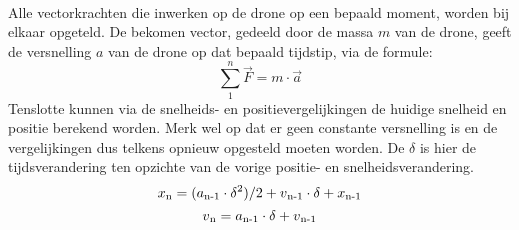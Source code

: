 \\
Alle vectorkrachten die inwerken op de drone op een bepaald moment, worden bij elkaar opgeteld. De bekomen vector, gedeeld door de massa \(m\) van de drone, geeft de versnelling \(a\) van de drone op dat bepaald tijdstip, via de formule:
\\
\begin{equation*}
\sum_{1}^{n} \vec{F} = m \cdot \vec{a} \label{krachtenevenwicht}
\end{equation*}
Tenslotte kunnen via de snelheids- en positievergelijkingen de huidige snelheid en positie berekend worden. Merk wel op dat er geen constante versnelling is en de vergelijkingen dus telkens opnieuw opgesteld moeten worden. De \(\delta\) is hier de tijdsverandering ten opzichte van de vorige positie- en snelheidsverandering.
\\
\begin{equation*}
x\textsubscript{n} = (a\textsubscript{n-1} \cdot \delta\textsuperscript{2})/2 + v\textsubscript{n-1} \cdot \delta + x\textsubscript{n-1} \label{positie}
\end{equation*}
\begin{equation*}
v\textsubscript{n} = a\textsubscript{n-1} \cdot \delta + v\textsubscript{n-1} \label{snelheid}
\end{equation*}
